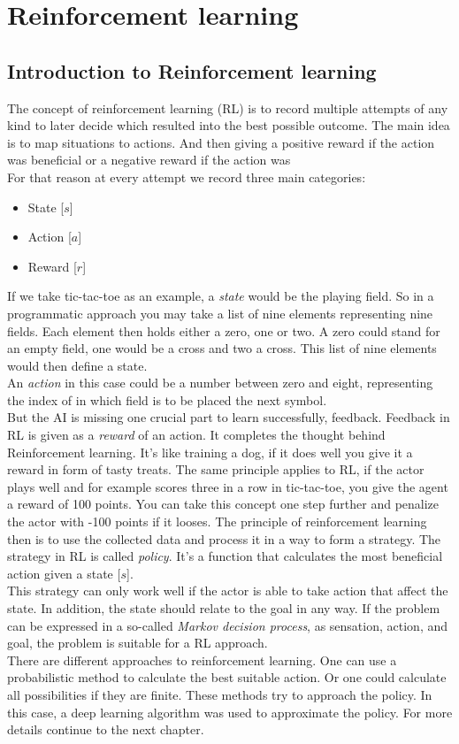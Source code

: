 \documentclass[12pt]{article}
\begin{document}
\section{Reinforcement learning}
\subsection{Introduction to Reinforcement learning}
The concept of reinforcement learning (RL) is to record multiple attempts of any kind to later decide which resulted into the best possible outcome. The main idea is to map situations to actions. And then giving a positive reward if the action was beneficial or a negative reward if the action was  \cite{suttonreinforcement} \\
For that reason at every attempt we record three main categories: 
\begin{itemize}
    \item State [$s$]
    \item Action [$a$]
    \item Reward [$r$]
\end{itemize}
If we take tic-tac-toe as an example, a \textit{state} would be the playing field. So in a programmatic approach you may take a list of nine elements representing nine fields. Each element then holds either a zero, one or two. A zero could stand for an empty field, one would be a cross and two a cross. This list of nine elements would then define a state. \\
An \textit{action} in this case could be a number between zero and eight, representing the index of in which field is to be placed the next symbol.\\
But the AI is missing one crucial part to learn successfully, feedback. Feedback in RL is given as a \textit{reward} of an action. It completes the thought behind Reinforcement learning. It's like training a dog, if it does well you give it a reward in form of tasty treats. The same principle applies to RL, if the actor plays well and for example scores three in a row in tic-tac-toe, you give the agent a reward of 100 points. You can take this concept one step further and penalize the actor with -100 points if it looses. The principle of reinforcement learning then is to use the collected data and process it in a way to form a strategy. The strategy in RL is called \textit{policy}. It's a function that calculates the most beneficial action given a state [$s$]. \cite{rl_tictactoe} \\
This strategy can only work well if the actor is able to take action that affect the state. In addition, the state should relate to the goal in any way. If the problem can be expressed in a so-called \textit{Markov decision process}, as sensation, action, and goal, the problem is suitable for a RL approach.
\cite{suttonreinforcement} \\
There are different approaches to reinforcement learning. One can use a probabilistic method to calculate the best suitable action. Or one could calculate all possibilities if they are finite. These methods try to approach the policy. In this case, a deep learning algorithm was used to approximate the policy. For more details continue to the next chapter.
\cite{rl_overview}
\end{document}
